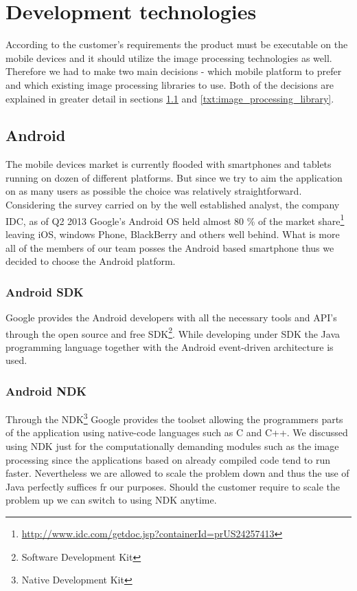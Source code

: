 \section{Development technologies} \label{txt:development technologies}

According to the customer's requirements the product must be executable on the mobile devices and it should utilize the image processing technologies as well. Therefore we had to make two main decisions - which mobile platform to prefer and which existing image processing libraries to use. Both of the decisions are explained in greater detail in sections \ref{txt:mobile_platform} and \ref{txt:image_processing_library}.


\subsection{Android} \label{txt:mobile_platform}

The mobile devices market is currently flooded with smartphones and tablets running on dozen of different platforms. 
But since we try to aim the application on as many users as possible the choice was relatively straightforward.
Considering the survey carried on by the well established analyst, the company IDC, as of Q2 2013 Google's Android OS held almost 80 \% of the market share\footnote{\url{http://www.idc.com/getdoc.jsp?containerId=prUS24257413}} leaving iOS, windows Phone, BlackBerry and others well behind.
What is more all of the members of our team posses the Android based smartphone thus we decided to choose the Android platform.

\subsubsection{Android SDK}

Google provides the Android developers with all the necessary tools and API's through the open source and free SDK\footnote{Software Development Kit}. While developing under SDK the Java programming language together with the Android event-driven architecture is used.

\subsubsection{Android NDK}

Through the NDK\footnote{Native Development Kit} Google provides the toolset allowing the programmers parts of the application using native-code languages such as C and C++.
We discussed using NDK just for the computationally demanding modules such as the image processing since the applications based on already compiled code tend to run faster.
Nevertheless we are allowed to scale the problem down and thus the use of Java perfectly suffices fr our purposes.
Should the customer require to scale the problem up we can switch to using NDK anytime.

